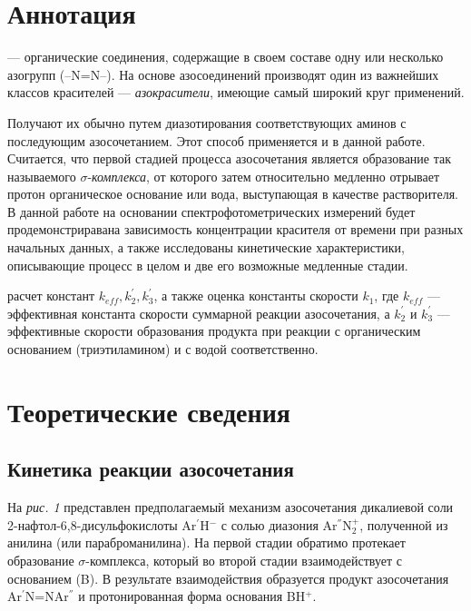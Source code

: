 \documentclass[a4paper]{article}
\begin{document}
\section{\LARGE \textbf{Аннотация}}
\par \hspace{0.4 cm} \large
\textit{} --- органические соединения, содержащие в своем составе одну или несколько азогрупп (--N=N--). На основе азосоединений производят один из важнейших классов красителей --- \textit{азокрасители}, имеющие самый широкий круг применений. \par
Получают их обычно путем диазотирования соответствующих аминов с последующим азосочетанием. Этот способ применяется и в данной работе. Считается, что первой стадией процесса азосочетания является образование так называемого $\sigma$-\textit{комплекса}, от которого затем относительно медленно отрывает протон органическое основание или вода, выступающая в качестве растворителя. В данной работе на основании спектрофотометрических измерений будет продемонстриравана зависимость концентрации красителя от времени при разных начальных данных, а также исследованы кинетические характеристики, описывающие процесс в целом и две его возможные медленные стадии. 
\par \vspace{0.2 cm}
\textbf{} расчет констант $k_{eff}, k^{'}_2, k^{'}_3$, а также оценка константы скорости $k_1$, где $k_{eff}$ --- эффективная константа скорости суммарной реакции азосочетания, а $k^{'}_2$ и $k^{'}_3$ --- эффективные скорости образования продукта при реакции с органическим основанием (триэтиламином) и с водой соответственно.


\section{\LARGE \textbf{Теоретические сведения}}
\subsection{\Large Кинетика реакции азосочетания}
\par \hspace{0.4 cm}
На \textit{рис. 1} представлен предполагаемый механизм азосочетания дикалиевой соли 2-нафтол-6,8-дисульфокислоты Ar$^{'}$H$^{-}$ с солью диазония Ar$^{''}$N$_2^{+}$, полученной из анилина (или параброманилина). На первой стадии обратимо протекает образование $\sigma$-комплекса, который во второй стадии взаимодействует с основанием (B). В результате взаимодействия образуется продукт азосочетания Ar$^{'}$N=NAr$^{''}$ и протонированная форма основания BH$^{+}$.
\end{document}
